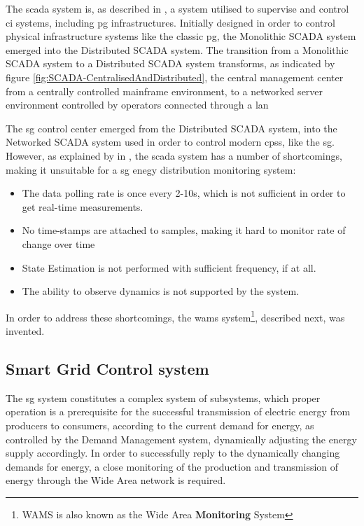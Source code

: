  The \acrshort{scada} system is, as described in \cite{alcaraz2012security}, a system utilised to supervise and control \acrfull{ci} systems, including \acrshort{pg} infrastructures. Initially designed in order to control physical infrastructure systems like the classic \acrlong{pg}, the Monolithic SCADA system emerged into the Distributed SCADA system. The transition from a Monolithic SCADA system to a Distributed SCADA system transforms, as indicated by figure \ref{fig:SCADA-CentralisedAndDistributed}, the central management center from a centrally controlled mainframe environment, to a networked server environment controlled by operators connected through a \acrfull{lan}
  
  
 The \acrshort{sg} control center emerged from the Distributed SCADA system, into the Networked SCADA system used in order to control modern \acrlong{cps}s, like the \acrshort{sg}.\\ 
 


 





 




However, as explained by  in \Cite{zamani2020introduction}, the \acrshort{scada} system has a number of shortcomings, making it unsuitable for a \acrshort{sg} enegy distribution monitoring system:

\begin{itemize}
    \item The data polling rate is once every 2-10s, which is not sufficient in order to get real-time measurements.
    \item No time-stamps are attached to samples, making it hard to monitor rate of change over time
    \item State Estimation is not performed with sufficient frequency, if at all.
    \item The ability to observe dynamics is not supported by the system.
\end{itemize}





In order to address these shortcomings, the \acrfull{wams} system\footnote{WAMS is also known as the Wide Area \textbf{Monitoring} System}, described next, was invented.






\subsection{Smart Grid  Control system}
The \acrlong{sg} system constitutes a complex system of subsystems, which proper operation is a prerequisite for the successful transmission of electric energy from producers to consumers, according to the current demand for energy, as controlled by the Demand Management system, dynamically adjusting the energy supply accordingly. In order to successfully reply to the dynamically changing demands for energy, a close monitoring of the production and transmission of energy through the Wide Area network is required. \\ 

